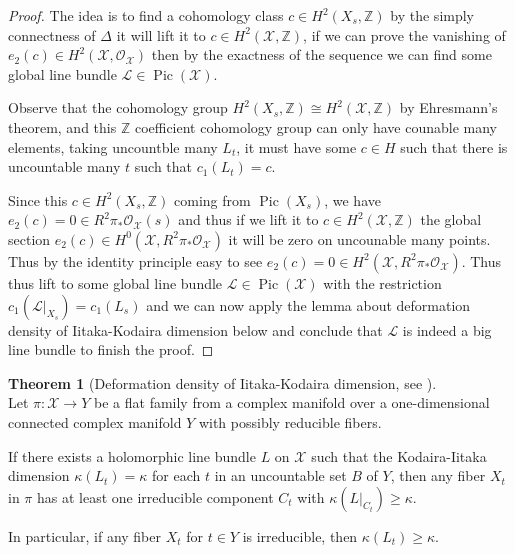 \documentclass[11pt]{article}
\theoremstyle{definition}
\newtheorem{theorem}{Theorem}
\begin{document}
\begin{proof}
	The idea is to find a cohomology class $c \in H^2(X_s,\mathbb{Z})$ by the simply connectness of $\Delta$ it will lift it to $c\in H^2(\mathcal{X},\mathbb{Z})$, if we can prove the vanishing of $e_2(c) \in H^2(\mathcal{X},\mathcal{O}_{\mathcal{X}})$ then by the exactness of the sequence we can find some global line bundle $\mathcal{L}\in \operatorname{Pic}(\mathcal{X})$.
	
	Observe that the cohomology group $H^2(X_s,\mathbb{Z})\cong H^2(\mathcal{X},\mathbb{Z})$  by Ehresmann's theorem, and this $\mathbb{Z}$ coefficient cohomology group can only have counable many elements, taking uncountble many $L_t$, it must have some $c\in H$ such that there is uncountable many $t$ such that $c_1(L_t) = c$.
	
	Since this $c\in H^2(X_s,\mathbb{Z})$ coming from $\operatorname{Pic}(X_s)$, we have $e_2(c) = 0\in R^2\pi_* \mathcal{O}_{\mathcal{X}}(s)$ and thus if we lift it to $c \in H^2(\mathcal{X},\mathbb{Z})$ the global section $e_2(c) \in H^0(\mathcal{X},R^2 \pi_* \mathcal{O}_{\mathcal{X}})$ it will be zero on uncounable many points. Thus by the identity principle easy to see $e_2(c) =0 \in H^2(\mathcal{X},R^2\pi_* \mathcal{O}_{\mathcal{X}})$. Thus thus lift to some global line bundle $\mathcal{L}\in \operatorname{Pic}(\mathcal{X})$ with the restriction $c_1(\mathcal{L}|_{X_s}) =c_1(L_s)$ and we can now apply the lemma about deformation density of Iitaka-Kodaira dimension below and conclude that $\mathcal{L}$ is indeed a big line bundle to finish the proof.
	
	\end{proof}
	
	\begin{theorem}[Deformation density of Iitaka-Kodaira dimension, see \cite{RaoTsai, LiebermanSernesi}]~\\
		Let $\pi: \mathcal{X} \rightarrow Y$ be a flat family from a complex manifold over a one-dimensional connected complex manifold $Y$ with possibly reducible fibers. 
		
		If there exists a holomorphic line bundle $L$ on $\mathcal{X}$ such that the Kodaira-Iitaka dimension $\kappa\left(L_t\right)=\kappa$ for each $t$ in an uncountable set $B$ of $Y$, then any fiber $X_t$ in $\pi$ has at least one irreducible component $C_t$ with $\kappa\left(\left.L\right|_{C_t}\right) \geq \kappa$. 
		
		In particular, if any fiber $X_t$ for $t \in Y$ is irreducible, then $\kappa\left(L_t\right) \geq \kappa$. 
	\end{theorem}
	\printbibliography	
	
\end{document}

